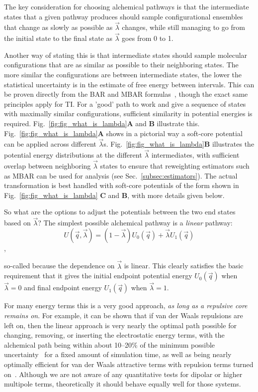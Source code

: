 \documentclass[9pt,bestpractices,pubversion]{livecoms}
\begin{document}
The key consideration for choosing alchemical pathways is that the intermediate states that a given pathway produces should sample configurational ensembles that change as slowly as possible as $\vec{\lambda}$ changes, while still managing to go from the initial state to the final state as $\vec{\lambda}$ goes from 0 to 1.

Another way of stating this is that intermediate states should sample molecular configurations that are as similar as possible to their neighboring states. The more similar the configurations are between intermediate states, the lower the statistical uncertainty is in the estimate of free energy between intervals. This can be proven directly from the BAR and MBAR formulas~\cite{bennett1976efficient,klimovich2015guidelines}, though the exact same principles apply for TI. For a 'good' path to work and give a sequence of states with maximally similar configurations, sufficient similarity in potential energies is required. Fig.~\ref{fig:fig_what_is_lambda}\textbf{A} and \textbf{B} illustrate this. Fig.~\ref{fig:fig_what_is_lambda}\textbf{A} shows in a pictorial way a soft-core potential can be applied across different $\vec{\lambda}$s. Fig.~\ref{fig:fig_what_is_lambda}\textbf{B} illustrates the potential energy distributions at the different $\vec{\lambda}$ intermediates, with sufficient overlap between neighboring $\vec{\lambda}$ states to ensure that reweighting estimators such as MBAR can be used for analysis (see Sec.~\ref{subsec:estimators}). The actual transformation is best handled with soft-core potentials of the form shown in Fig.~\ref{fig:fig_what_is_lambda} \textbf{C} and \textbf{B}, with more details given below. 

So what are the options to adjust the potentials between the two end states based on $\vec{\lambda}$? The simplest possible alchemical pathway is a \textit{linear} pathway:
\begin{equation}
U(\vec{q},\vec{\lambda}) = (1-\vec{\lambda}) U_0(\vec{q}) + \vec{\lambda}U_1(\vec{q}) \end{equation},

so-called because the dependence on $\vec{\lambda}$ is linear. This clearly satisfies the basic requirement that it gives the initial endpoint potential energy $U_0(\vec{q})$ when $\vec{\lambda}=0$ and final endpoint energy $U_1(\vec{q})$ when $\vec{\lambda}=1$. 

For many energy terms this is a very good approach, \textit{as long as a repulsive core remains on}. For example, it can be shown that if van der Waals repulsions are left on, then the linear approach is very nearly the optimal path possible for changing, removing, or inserting the electrostatic energy terms, with the alchemical path being within about 10--20\% of the minimum possible uncertainty~\cite{naden2015linear} for a fixed amount of simulation time, as well as being nearly optimally efficient for van der Waals attractive terms with repulsion terms turned on~\cite{naden2014linear}. Although we are not aware of any quantitative tests for dipolar or higher multipole terms, theoretically it should behave equally well for those systems.
\end{document}
